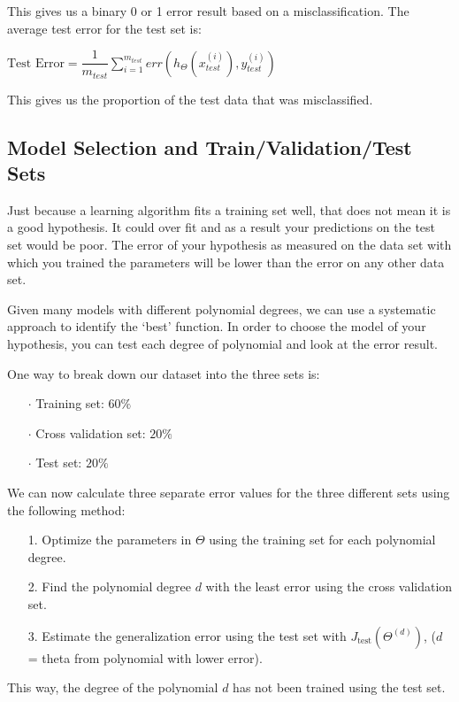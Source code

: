 \documentclass[UTF8]{article}
\begin{document}
This gives us a binary 0 or 1 error result based on a misclassification. The average test error for the test set is:

$\text{Test Error} = \dfrac{1}{m_{test}} \sum^{m_{test}}_{i=1} err(h_\Theta(x^{(i)}_{test}), y^{(i)}_{test})$

This gives us the proportion of the test data that was misclassified.

\subsection{Model Selection and Train/Validation/Test Sets}

Just because a learning algorithm fits a training set well, that does not mean it is a good hypothesis. It could over fit and as a result your predictions on the test set would be poor. The error of your hypothesis as measured on the data set with which you trained the parameters will be lower than the error on any other data set.

Given many models with different polynomial degrees, we can use a systematic approach to identify the `best' function. In order to choose the model of your hypothesis, you can test each degree of polynomial and look at the error result.

One way to break down our dataset into the three sets is:

\begin{itemize}
\item[$\cdot$]Training set: $60\%$
\item[$\cdot$]Cross validation set: $20\%$
\item[$\cdot$]Test set: $20\%$
\end{itemize}

We can now calculate three separate error values for the three different sets using the following method:

\begin{itemize}
\item[{1.}]Optimize the parameters in $\Theta$ using the training set for each polynomial degree.
\item[{2.}]Find the polynomial degree $d$ with the least error using the cross validation set.
\item[{3.}]Estimate the generalization error using the test set with $J_\text{test}(\Theta^{(d)})$, ($d$ = theta from polynomial with lower error).
\end{itemize}

This way, the degree of the polynomial $d$ has not been trained using the test set.
\end{document}
